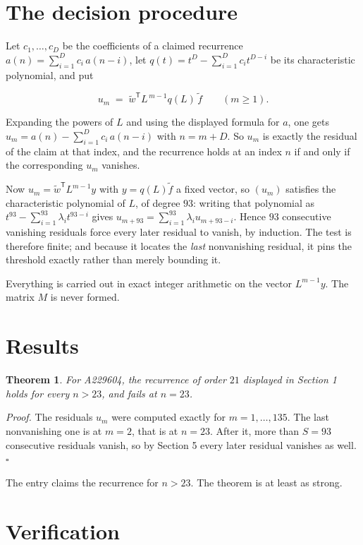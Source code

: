 \documentclass[11pt]{article}
\newtheorem{theorem}{Theorem}
\theoremstyle{definition}
\begin{document}
\section{The decision procedure}

Let $c_1,\dots,c_D$ be the coefficients of a claimed recurrence $a(n) = \sum_{i=1}^{D} c_i\,a(n-i)$, let $q(t) = t^{D} - \sum_{i=1}^{D} c_i t^{D-i}$ be its characteristic polynomial, and put

\[u_m \;=\; \tilde w^{\mathsf T} L^{\,m-1} q(L)\,\tilde f \qquad (m \ge 1).\]

Expanding the powers of $L$ and using the displayed formula for $a$, one gets $u_m = a(n) - \sum_{i=1}^{D} c_i\,a(n-i)$ with $n = m + D$. So $u_m$ is exactly the residual of the claim at that index, and the recurrence holds at an index $n$ if and only if the corresponding $u_m$ vanishes.

Now $u_m = \tilde w^{\mathsf T} L^{m-1} y$ with $y = q(L)\tilde f$ a fixed vector, so $(u_m)$ satisfies the characteristic polynomial of $L$, of degree $93$: writing that polynomial as $t^{93} - \sum_{i=1}^{93} \lambda_i t^{93-i}$ gives $u_{m+93} = \sum_{i=1}^{93} \lambda_i u_{m+93-i}$. Hence $93$ consecutive vanishing residuals force every later residual to vanish, by induction. The test is therefore finite; and because it locates the {\itshape last} nonvanishing residual, it pins the threshold exactly rather than merely bounding it.

Everything is carried out in exact integer arithmetic on the vector $L^{m-1}y$. The matrix $M$ is never formed.

\section{Results}

\begin{theorem} For A229604, the recurrence of order $21$ displayed in Section 1 holds for every $n > 23$, and fails at $n = 23$.\end{theorem}

{\itshape Proof.} The residuals $u_m$ were computed exactly for $m = 1,\dots,135$. The last nonvanishing one is at $m = 2$, that is at $n = 23$. After it, more than $S = 93$ consecutive residuals vanish, so by Section 5 every later residual vanishes as well. $\square$

The entry claims the recurrence for $n > 23$. The theorem is at least as strong.

\section{Verification}
\end{document}
